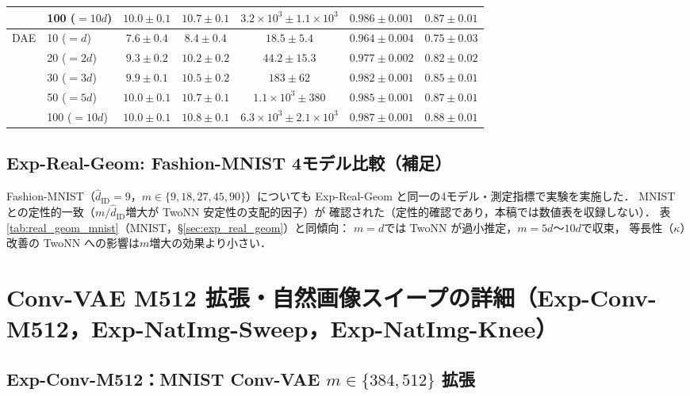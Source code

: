 \documentclass[11pt,a4paper]{jsarticle}
\newcommand{\kap}{\kappa}
\begin{document}
\begin{table}[H]
\begin{tabular}{llccccc}
 & 100 ($=10d$) & $10.0\pm0.1$ & $10.7\pm0.1$ & $3.2\times10^3\pm 1.1\times10^3$ & $0.986\pm0.001$ & $0.87\pm0.01$ \\
\midrule
\multirow{5}{*}{DAE}
 & 10 ($=d$)    & $7.6\pm0.4$ & $8.4\pm0.4$ & $18.5\pm5.4$ & $0.964\pm0.004$ & $0.75\pm0.03$ \\
 & 20 ($=2d$)   & $9.3\pm0.2$ & $10.2\pm0.2$ & $44.2\pm15.3$ & $0.977\pm0.002$ & $0.82\pm0.02$ \\
 & 30 ($=3d$)   & $9.9\pm0.1$ & $10.5\pm0.2$ & $183\pm62$ & $0.982\pm0.001$ & $0.85\pm0.01$ \\
 & 50 ($=5d$)   & $10.0\pm0.1$ & $10.7\pm0.1$ & $1.1\times10^3\pm 380$ & $0.985\pm0.001$ & $0.87\pm0.01$ \\
 & 100 ($=10d$) & $10.0\pm0.1$ & $10.8\pm0.1$ & $6.3\times10^3\pm 2.1\times10^3$ & $0.987\pm0.001$ & $0.88\pm0.01$ \\
\bottomrule
\end{tabular}
\end{table}

\subsection*{Exp-Real-Geom: Fashion-MNIST 4モデル比較（補足）}

Fashion-MNIST（$\hat{d}_\mathrm{ID}=9$，$m \in \{9,18,27,45,90\}$）についても
Exp-Real-Geom と同一の4モデル・測定指標で実験を実施した．
MNIST との定性的一致（$m/\hat{d}_\mathrm{ID}$増大が TwoNN 安定性の支配的因子）が
確認された（定性的確認であり，本稿では数値表を収録しない）．
表\ref{tab:real_geom_mnist}（MNIST，§\ref{sec:exp_real_geom}）と同傾向：
$m = d$では TwoNN が過小推定，$m = 5d$〜$10d$で収束，
等長性（$\kap$）改善の TwoNN への影響は$m$増大の効果より小さい．

\section{Conv-VAE M512 拡張・自然画像スイープの詳細（Exp-Conv-M512，Exp-NatImg-Sweep，Exp-NatImg-Knee）}\label{app:convvae_natimg}

\subsection*{Exp-Conv-M512：MNIST Conv-VAE $m \in \{384, 512\}$ 拡張}
\end{document}
